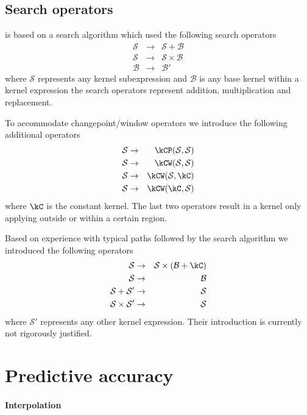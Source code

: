 \subsection{Search operators}

\procedurename{} is based on a search algorithm which used the following search operators
%
\begin{eqnarray}
\mathcal{S} &\to& \mathcal{S} + \mathcal{B} \\
\mathcal{S} &\to& \mathcal{S} \times \mathcal{B} \\
\mathcal{B} &\to& \mathcal{B'}
\end{eqnarray}
%
where $\mathcal{S}$ represents any kernel subexpression and $\mathcal{B}$ is any base kernel within a kernel expression \ie the search operators represent addition, multiplication and replacement.

To accommodate changepoint/window operators we introduce the following additional operators
%
\begin{eqnarray}
\mathcal{S} &\to& \kCP(\mathcal{S},\mathcal{S}) \\
\mathcal{S} &\to& \kCW(\mathcal{S},\mathcal{S}) \\
\mathcal{S} &\to& \kCW(\mathcal{S},\kC) \\
\mathcal{S} &\to& \kCW(\kC,\mathcal{S})
\end{eqnarray}
%
where $\kC$ is the constant kernel.
The last two operators result in a kernel only applying outside or within a certain region.

Based on experience with typical paths followed by the search algorithm we introduced the following operators
%
\begin{eqnarray}
\mathcal{S} &\to& \mathcal{S} \times (\mathcal{B} + \kC)\\
\mathcal{S} &\to& \mathcal{B}\\
\mathcal{S} + \mathcal{S'} &\to& \mathcal{S}\\
\mathcal{S} \times \mathcal{S'} &\to& \mathcal{S}
\end{eqnarray}
%
where $\mathcal{S'}$ represents any other kernel expression.
Their introduction is currently not rigorously justified.

\section{Predictive accuracy}

\paragraph{Interpolation}

